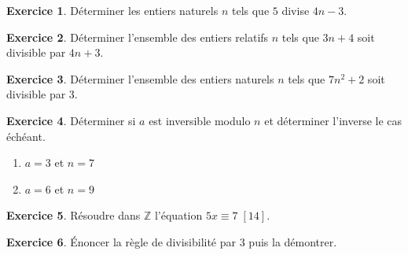 \documentclass{exam}
\theoremstyle{definition}
\newtheorem{exercice}{Exercice}
\begin{document}
    \large

    \vfill


    \vspace{2mm}


    \vspace{2mm}

    \begin{exercice}
    Déterminer les entiers naturels $n$ tels que $5$ divise $4n - 3$.
    \end{exercice}
    
    \begin{exercice}
    Déterminer l’ensemble des entiers relatifs $n$ tels que $3n + 4$ soit divisible par $4n + 3$.
    \end{exercice}
    
    \begin{exercice}
    Déterminer l’ensemble des entiers naturels $n$ tels que $7n^2 + 2$ soit divisible par $3$.
    \end{exercice}
    
    \begin{exercice}
    Déterminer si $a$ est inversible modulo $n$ et déterminer l’inverse le cas échéant.
    \begin{enumerate}
        \item $a = 3$ et $n = 7$
        \item $a = 6$ et $n = 9$
    \end{enumerate}
    \end{exercice}
    
    \begin{exercice}
        Résoudre dans $\mathbb{Z}$ l'équation $5x \equiv 7 \; [14]$.
    \end{exercice}
    
    \begin{exercice}
        Énoncer la règle de divisibilité par $3$ puis la démontrer.
    \end{exercice}
    
\end{document}
